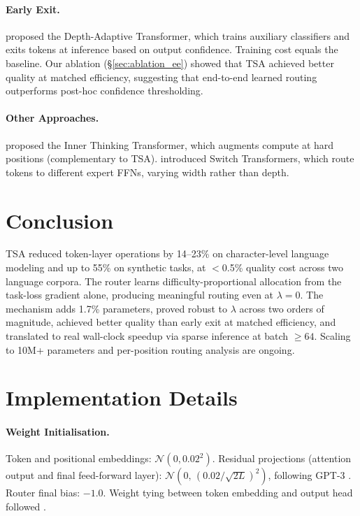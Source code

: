 \documentclass{article}
\newcommand{\tsa}{TSA\xspace}
\begin{document}
\paragraph{Early Exit.}
\citet{elbayad2020depth} proposed the Depth-Adaptive Transformer, which trains
auxiliary classifiers and exits tokens at inference based on output confidence.
Training cost equals the baseline. Our ablation (\S\ref{sec:ablation_ee}) showed
that \tsa achieved better quality at matched efficiency, suggesting that end-to-end
learned routing outperforms post-hoc confidence thresholding.

\paragraph{Other Approaches.}
\citet{chen2025itt} proposed the Inner Thinking Transformer, which augments compute
at hard positions (complementary to \tsa). \citet{fedus2022switch} introduced Switch
Transformers, which route tokens to different expert FFNs, varying width rather than
depth.

\section{Conclusion}

\tsa reduced token-layer operations by 14--23\% on character-level language modeling
and up to 55\% on synthetic tasks, at $<$0.5\% quality cost across two language
corpora. The router
learns difficulty-proportional allocation from the task-loss gradient alone, producing
meaningful routing even at $\lambda{=}0$. The mechanism adds 1.7\% parameters, proved
robust to $\lambda$ across two orders of magnitude, achieved better quality than early
exit at matched efficiency, and translated to real wall-clock speedup via sparse
inference at batch $\geq 64$. Scaling to 10M+ parameters and per-position routing
analysis are ongoing.




\appendix
\section{Implementation Details}
\label{app:impl}

\paragraph{Weight Initialisation.}
Token and positional embeddings: $\mathcal{N}(0, 0.02^2)$. Residual projections
(attention output and final feed-forward layer):
$\mathcal{N}(0,\, (0.02 / \sqrt{2L})^2)$, following GPT-3 \citep{brown2020gpt3}.
Router final bias: $-1.0$. Weight tying between token embedding and output head
followed \citet{press2017tying}.
\end{document}
